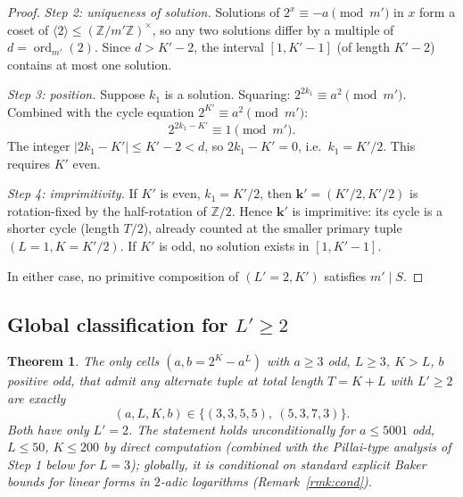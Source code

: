 \documentclass[11pt]{amsart}
\theoremstyle{plain}
\newtheorem{theorem}{Theorem}
\theoremstyle{definition}
\DeclareMathOperator{\ord}{ord}
\begin{document}
\begin{proof}
\textit{Step 2: uniqueness of solution.} Solutions of
$2^x \equiv -a \pmod{m'}$ in $x$ form a coset of
$\langle 2 \rangle \leq (\mathbb{Z}/m'\mathbb{Z})^\times$, so any
two solutions differ by a multiple of $d = \ord_{m'}(2)$. Since
$d > K' - 2$, the interval $[1, K' - 1]$ (of length $K' - 2$)
contains at most one solution.

\textit{Step 3: position.} Suppose $k_1$ is a solution. Squaring:
$2^{2k_1} \equiv a^2 \pmod{m'}$. Combined with the cycle equation
$2^{K'} \equiv a^2 \pmod{m'}$:
\[
2^{2k_1 - K'} \equiv 1 \pmod{m'}.
\]
The integer $|2k_1 - K'| \leq K' - 2 < d$, so
$2k_1 - K' = 0$, i.e.~$k_1 = K'/2$. This requires $K'$ even.

\textit{Step 4: imprimitivity.} If $K'$ is even, $k_1 = K'/2$, then
$\mathbf{k}' = (K'/2, K'/2)$ is rotation-fixed by the half-rotation
of $\mathbb{Z}/2$. Hence $\mathbf{k}'$ is imprimitive: its cycle is a
shorter cycle (length $T/2$), already counted at the smaller primary
tuple $(L = 1, K = K'/2)$. If $K'$ is odd, no solution exists in
$[1, K' - 1]$.

In either case, no primitive composition of $(L'=2, K')$ satisfies
$m' \mid S$.
\end{proof}

\subsection{Global classification for $L' \geq 2$}

\begin{theorem} \label{thm:053}
The only cells $(a, b = 2^K - a^L)$ with $a \geq 3$ odd, $L \geq 3$,
$K > L$, $b$ positive odd, that admit any alternate tuple at total
length $T = K + L$ with $L' \geq 2$ are exactly
\[
(a, L, K, b) \in \{(3, 3, 5, 5),\ (5, 3, 7, 3)\}.
\]
Both have only $L' = 2$. The statement holds unconditionally for
$a \leq 5001$ odd, $L \leq 50$, $K \leq 200$ by direct computation
(combined with the Pillai-type analysis of Step 1 below for $L = 3$);
globally, it is conditional on standard explicit Baker bounds for
linear forms in $2$-adic logarithms (Remark~\ref{rmk:cond}).
\end{theorem}
\end{document}
